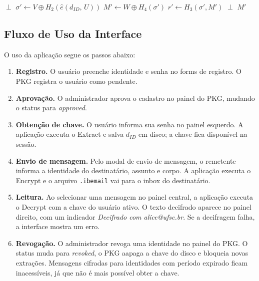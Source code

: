 \begin{algorithm}[H]
\caption{IBE Mail -- Decrypt}
\begin{algorithmic}[1]
    \Return $\perp$ 
  \EndIf
  \State $\sigma' \leftarrow V \oplus H_2(\hat{e}(d_{\mathit{ID}},\, U))$
  \State $M' \leftarrow W \oplus H_4(\sigma')$
  \State $r' \leftarrow H_3(\sigma', M')$
    \Return $\perp$ 
  \EndIf
  \Return $M'$
\EndProcedure
\end{algorithmic}
\end{algorithm}

\subsection{Fluxo de Uso da Interface}

O uso da aplicação segue os passos abaixo:

\begin{enumerate}
  \item \textbf{Registro.} O usuário preenche identidade e senha no forms de registro.
    O PKG registra o usuário como pendente.

  \item \textbf{Aprovação.} O administrador aprova o cadastro no painel do PKG, mudando
    o status para \textit{approved}.

  \item \textbf{Obtenção de chave.} O usuário informa sua senha no painel esquerdo. A
    aplicação executa o Extract e salva $d_{\mathit{ID}}$ em disco; a chave fica
    disponível na sessão.

  \item \textbf{Envio de mensagem.} Pelo modal de envio de mensagem, o remetente informa a 
      identidade do destinatário, assunto e corpo. A aplicação executa o Encrypt e o arquivo
    \texttt{.ibemail} vai para o inbox do destinatário.

  \item \textbf{Leitura.} Ao selecionar uma mensagem no painel central, a aplicação executa o
    Decrypt com a chave do usuário ativo. O texto decifrado aparece no painel direito, com um
    indicador \textit{Decifrado com alice@ufsc.br}. Se a decifragem falha, a interface mostra
    um erro.

  \item \textbf{Revogação.} O administrador revoga uma identidade no painel do PKG. O status
    muda para \textit{revoked}, o PKG aapaga a chave do disco e bloqueia novas extrações.
    Mensagens cifradas para identidades com período expirado ficam inacessíveis, já que não é
    mais possível obter a chave.
\end{enumerate}
